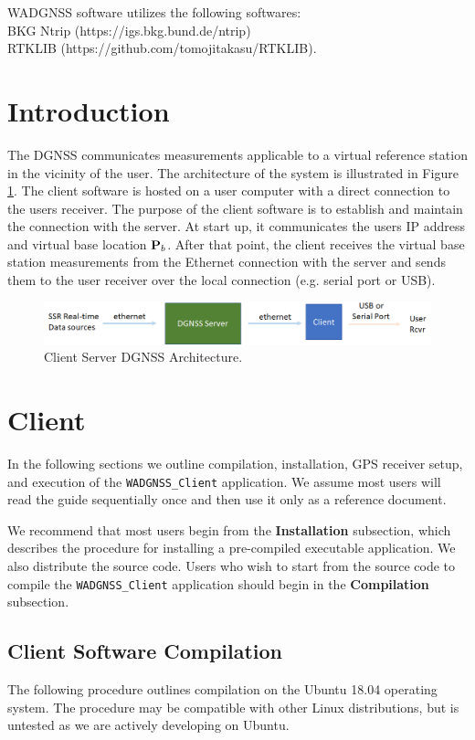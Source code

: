 \noindent
WADGNSS software utilizes the following softwares: \\
BKG Ntrip (https://igs.bkg.bund.de/ntrip) \\
RTKLIB (https://github.com/tomojitakasu/RTKLIB).


\newpage
\section{Introduction}
The DGNSS communicates measurements applicable to a virtual reference station in the vicinity of the user. 
The architecture of the system is illustrated in Figure \ref{fig:ClientServer}. 
The client software is hosted on a user computer with a direct connection to the users receiver.  
The purpose of the client software is to establish and maintain the connection with the server.
At start up, it communicates the users IP address and virtual base location $\mathbf{P}_b$.
After that point, the client receives the virtual base station measurements from the Ethernet connection with the server and sends them to the user receiver over the local connection (e.g. serial port or USB).
 

\begin{figure}[H]
	\centering
	\includegraphics[scale=0.5]{./graphics/ClientServer}
	\caption{Client Server DGNSS Architecture. }
	\label{fig:ClientServer}
\end{figure}

\section{Client}
In the following sections we outline compilation, installation, GPS receiver setup, and execution of the \texttt{WADGNSS\_Client} application. 
We assume most users will read the guide sequentially once and then use it only as a reference document.

We recommend that most users begin from the \textbf{Installation} subsection, which describes the procedure for installing a pre-compiled executable application. 
We also distribute the source code.
Users who wish to start from the source code to compile the \texttt{WADGNSS\_Client} application should begin in the \textbf{Compilation} subsection. 

\subsection{Client Software Compilation}
The following procedure outlines compilation on the Ubuntu 18.04 operating system. The procedure may be compatible with other Linux distributions, but is untested as we are actively developing on Ubuntu.

